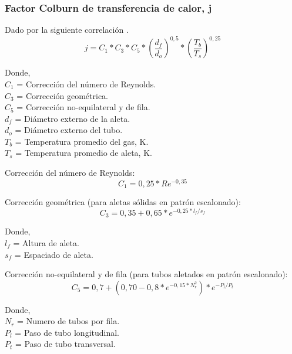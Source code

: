 \subsubsection{Factor Colburn de transferencia de calor, j}
\par Dado por la siguiente correlación \cite{bib:colburn}.
\begin{equation}
j = C_1 *C_3 *C_5 *(\dfrac{d_f}{d_o})^{0,5} *(\frac{T_b}{T_s})^{0,25}
\end{equation}
\par Donde, \\
$C_1$ = Corrección del número de Reynolds. \\
$C_3$ = Corrección geométrica. \\
$C_5$ = Corrección no-equilateral y de fila. \\
$d_f$ = Diámetro externo de la aleta. \\
$d_o$ = Diámetro externo del tubo. \\
$T_b$ = Temperatura promedio del gas, K. \\
$T_s$ = Temperatura promedio de aleta, K.
\par Corrección del número de Reynolds:
\begin{equation}
C_1 = 0,25 *Re^{-0,35}
\end{equation}
\par Corrección geométrica (para aletas sólidas en patrón escalonado):
\begin{equation}
C_3 = 0,35 +0,65 *e^{-0,25*l_f/s_f}
\end{equation}
\par Donde, \\
$l_f$ = Altura de aleta. \\
$s_f$ = Espaciado de aleta.
\par Corrección no-equilateral y de fila (para tubos aletados en patrón escalonado):
\begin{equation}
C_5 = 0,7 +(0,70 -0,8 *e^{-0,15 *N_r^2}) *e^{-P_l/P_t}
\end{equation}
\par Donde, \\
$N_r$ = Numero de tubos por fila. \\
$P_l$ = Paso de tubo longitudinal.\\
$P_t$ = Paso de tubo transversal. \\


